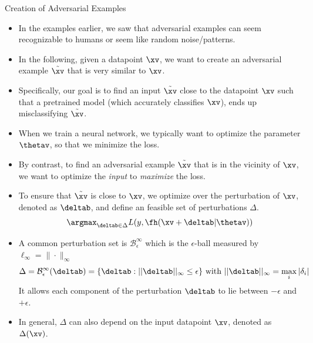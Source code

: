 \documentclass[11pt,compress,t,notes=noshow, xcolor=table]{beamer}
\begin{document}
\begin{vbframe} {Creation of Adversarial Examples}
  \begin{itemize}
  \item In the examples earlier, we saw that adversarial examples can seem recognizable to humans or seem like random noise/patterns.
  \item In the following, given a datapoint $\xv$, we want to create an adversarial example $\tilde{\xv}$ that is very similar to $\xv$. 
    \item Specifically, our goal is to find an input $\tilde{\xv}$ close to the datapoint $\xv$ such that a pretrained model (which accurately classifies $\xv$), ends up misclassifying $\tilde{\xv}$. 
    \item When we train a neural network, we typically want to optimize the parameter $\thetav$, so that we minimize the loss. 
    \item By contrast, to find an adversarial example $\tilde{\xv}$ that is in the vicinity of $\xv$, we want to optimize the \textit{input} to \textit{maximize} the loss.    \framebreak
    \item To ensure that $\tilde{\xv}$ is close to $\xv$, we optimize over the perturbation of $\xv$, denoted as $\deltab$, and define an feasible set of perturbations $\Delta$. 
    \begin{equation*}
        \argmax_{\deltab \in \Delta} L(y, \fh(\xv + \deltab| \thetav))
    \end{equation*}
    \item A common perturbation set is $\mathcal{B}^{\infty}_{\epsilon}$ which is the $\epsilon$-ball measured by $\ell_{\infty} = \|\cdot\|_{\infty}$
    \begin{equation*}
        \Delta = \mathcal{B}^{\infty}_{\epsilon}(\deltab) = \{\deltab: ||\deltab||_{\infty} \le \epsilon\} \text{ with } ||\deltab||_{\infty} = \max_i|\delta_i|
    \end{equation*}
    It allows each component of the perturbation $\deltab$ to lie between  $-\epsilon$ and $+ \epsilon$.
    \item In general, $\Delta$ can also depend on the input datapoint $\xv$, denoted as $\Delta(\xv)$.
  \end{itemize}
\end{vbframe}
\end{document}
